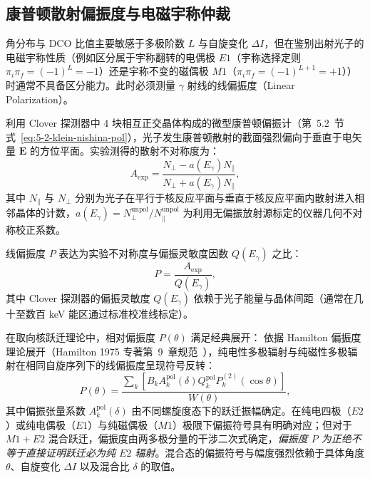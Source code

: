 \subsection{康普顿散射偏振度与电磁宇称仲裁}\label{subsec:5-7-4}

角分布与 DCO 比值主要敏感于多极阶数 $L$ 与自旋变化 $\Delta I$，但在鉴别出射光子的电磁宇称性质（例如区分属于宇称翻转的电偶极 $E1$（宇称选择定则 $\pi_i \pi_f = (-1)^L = -1$）还是宇称不变的磁偶极 $M1$（$\pi_i \pi_f = (-1)^{L+1} = +1$））时通常不具备区分能力。此时必须测量 $\gamma$ 射线的线偏振度（Linear Polarization）。

利用 Clover 探测器中 4 块相互正交晶体构成的微型康普顿偏振计（第~5.2~节式~\eqref{eq:5-2-klein-nishina-pol}），光子发生康普顿散射的截面强烈偏向于垂直于电矢量 $\mathbf{E}$ 的方位平面。实验测得的散射不对称度为：
\begin{equation}\label{eq:5-7-asym-exp}
A_{\mathrm{exp}} = \frac{N_\perp - a(E_\gamma) N_\parallel}{N_\perp + a(E_\gamma) N_\parallel},
\end{equation}
其中 $N_\parallel$ 与 $N_\perp$ 分别为光子在平行于核反应平面与垂直于核反应平面内散射进入相邻晶体的计数，$a(E_\gamma) = N_\perp^{\mathrm{unpol}} / N_\parallel^{\mathrm{unpol}}$ 为利用无偏振放射源标定的仪器几何不对称校正系数。

线偏振度 $P$ 表达为实验不对称度与偏振灵敏度因数 $Q(E_\gamma)$ 之比：
\begin{equation}\label{eq:5-7-pol-degree}
P = \frac{A_{\mathrm{exp}}}{Q(E_\gamma)},
\end{equation}
其中 Clover 探测器的偏振灵敏度 $Q(E_\gamma)$ 依赖于光子能量与晶体间距（通常在几十至数百 keV 能区通过标准校准线标定）。

在取向核跃迁理论中，相对偏振度 $P(\theta)$ 满足经典展开：
依据 Hamilton 偏振度理论展开（Hamilton 1975 专著第~9~章规范~\cite{book-hamilton-electromagnetic-interaction}），纯电性多极辐射与纯磁性多极辐射在相同自旋序列下的线偏振度呈现符号反转：
\begin{equation}\label{eq:5-7-pol-theor}
P(\theta) = \frac{\sum_k \left[ B_k A_k^{\mathrm{pol}}(\delta) Q_k^{\mathrm{pol}} P_k^{(2)}(\cos\theta) \right]}{W(\theta)},
\end{equation}
其中偏振张量系数 $A_k^{\mathrm{pol}}(\delta)$ 由不同螺旋度态下的跃迁振幅确定。在纯电四极（$E2$）或纯电偶极（$E1$）与纯磁偶极（$M1$）极限下偏振符号具有明确对应；但对于 $M1+E2$ 混合跃迁，偏振度由两多极分量的干涉二次式确定，\emph{偏振度 $P$ 为正绝不等于直接证明跃迁必为纯 $E2$ 辐射}。混合态的偏振符号与幅度强烈依赖于具体角度 $\theta$、自旋变化 $\Delta I$ 以及混合比 $\delta$ 的取值。


